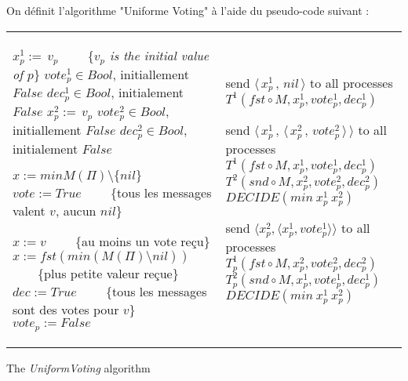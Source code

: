 \documentclass{article}
\begin{document}
On définit l'algorithme "Uniforme Voting" à l'aide du pseudo-code suivant :
\begin{algorithm}[htb]
\scriptsize{
\begin{distribalgo}[1]
\begin{tabular}{ll}
\begin{minipage}{41em}


\INDENT{\textbf{Initialization:}}
	\STATE $x^1_p :=\, v_p$ ~~~~\{\emph{$v_p$ is the initial value of $p$}\}
	\STATE $vote^1_p \in Bool$, initiallement $False$
	\STATE $dec^1_p \in Bool$, initialement $False$
	\BLANK
	\STATE $x^2_p :=\, v_p$
	\STATE $vote^2_p \in Bool$, initiallement $False$
	\STATE $dec^2_p \in Bool$, initialement $False$

\ENDINDENT
\BLANK

\INDENT{\textbf{Fonctions sur une instance}}
	\INDENT{$T^1_p(M, ref ~ x, ref ~ vote, ref ~ dec):$}
		\STATE $ x := min M(\Pi) \setminus \{nil\}$ 
		\IF{$M(\Pi) = \{v\}$} 
			\STATE $vote := True$ ~~~~\{tous les messages valent $v$, aucun $nil$\}
		\ENDIF
	\ENDINDENT
	\BLANK

	\INDENT{$T^2_p(M, ref ~ x, ref ~ vote, ref ~ dec):$}

		\IF{$\exists v \in V, q \in \Pi, M(q) = \langle v, True \rangle$}
			\STATE $x := v$ ~~~~\{au moins un vote reçu\}
		\ELSE
			\STATE $x := fst (min (M(\Pi) \setminus {nil}))$ ~~~~\{plus petite valeur reçue\}
		\ENDIF
		\IF{$M(\Pi) = \{\langle v, True \rangle\}$}
			\STATE $dec := True$ ~~~~\{tous les messages sont des votes pour $v$\}
		\ENDIF
		\STATE $vote_p := False$
	\ENDINDENT
\ENDINDENT

\end{minipage}
&
\begin{minipage}{31em}

\INDENT{\textbf{Round $r=0\,$:}}
	\INDENT{$S_p:$}
		\STATE send $\langle\, x^1_p\, ,\, nil \, \rangle$ to all processes
	\ENDINDENT
	\INDENT{$T_p(M):$}
		\STATE $T^1(fst \circ M, x^1_p, vote^1_p, dec^1_p)$
	\ENDINDENT
\ENDINDENT

\INDENT{\textbf{Round $r=2\phi+2\,$:}}
	\INDENT{$S_p:$}
		\STATE send $\langle\, x^1_p\, ,\, \langle \, x^2_p \, ,\, vote^2_p \, \rangle \, \rangle$ to all processes
	\ENDINDENT
	\BLANK
	\INDENT{$T_p(M):$}
		\STATE $T^1(fst \circ M, x^1_p, vote^1_p, dec^1_p)$
		\STATE $T^2(snd \circ M, x^2_p, vote^2_p, dec^2_p)$
		\IF{$dec^1_p \wedge dec^2_p $}
			\STATE $DECIDE(min ~ x^1_p ~ x^2_p)$
		\ENDIF
	\ENDINDENT
\ENDINDENT

\INDENT{\textbf{Round $r=2\phi+1\,$:}}
	\INDENT{$S_p:$}
		\STATE send $\langle x^2_p , \langle x^1_p, vote^1_p \rangle \rangle$ to all processes
	\ENDINDENT
	\BLANK
	\INDENT{$T_p(M)$}
		\STATE $T^1_p(fst \circ M, x_p^2, vote^2_p, dec^2_p)$
		\STATE $T^2_p(snd \circ M, x_p^1, vote^1_p, dec^1_p)$
		\IF{$dec^1_p \wedge dec^2_p $}
			\STATE $DECIDE(min ~ x^1_p ~ x^2_p)$
		\ENDIF
	\ENDINDENT
\ENDINDENT

\end{minipage}
\end{tabular}

\caption{The {\em UniformVoting} algorithm}
\label{unifvotfig}
\end{distribalgo}
}
\end{algorithm}
\end{document}
